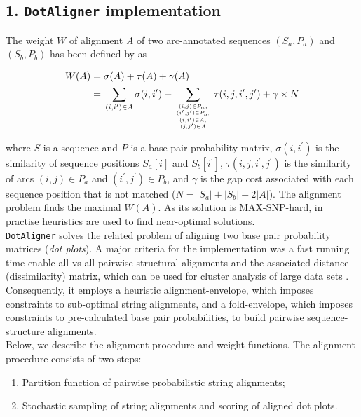 \documentclass{bmcart}
\newcommand\dotaligner{\texttt{DotAligner}}
\begin{document}
\subsection*{ 1. \dotaligner{} implementation }
\noindent The weight $W$ of alignment \emph{A}
of two arc-annotated sequences $(S_a,P_a)$ and $(S_b,P_b)$ has been defined by \cite{Palu2010} as

\begin{equation}\label{eq1}
\begin{aligned}
	W(A) ={} & \sigma(A) + \tau(A) + \gamma(A) \\
	     ={} & \sum_{(i,i^\prime) \in A} \sigma(i,i^\prime) + \sum_{(i,j) \in
	P_a,\atop {(i^\prime,j^\prime) \in P_b,\atop {(i,i^\prime) \in
	A,\atop (j,j^\prime) \in A}}} \tau(i,j,i^\prime,j^\prime) + \gamma
	\times N
\end{aligned}
\end{equation}

\noindent where $S$ is a sequence and $P$ is a base pair probability matrix,
$\sigma(i,i^\prime)$ is the similarity of sequence positions $S_a[i]$ and
$S_b[i^\prime]$, $\tau(i,j,i^\prime,j^\prime)$ is the similarity of arcs $(i,j)
\in P_a$ and $(i^\prime,j^\prime) \in P_b$,
and $\gamma$ is the gap cost associated with each sequence position that is not
matched ($N = |S_a|+|S_b|-2|A|$). The alignment problem finds the maximal
$W(A)$. As its solution is MAX-SNP-hard, in practise heuristics are used to find
near-optimal solutions.\\

\dotaligner{} solves the related problem of aligning two base pair
probability matrices (\emph{dot plots}). A major criteria for the implementation was a fast
running time enable all-vs-all pairwise structural alignments and the 
associated distance (dissimilarity) matrix, which can be used for 
cluster analysis of large data sets \cite{Will17432929}. Consequently, 
it employs a heuristic alignment-envelope, 
which imposes constraints to sub-optimal string alignments, 
and a fold-envelope, which imposes constraints to pre-calculated base pair probabilities, 
to build pairwise sequence-structure alignments. \\

Below, we describe the alignment procedure and weight functions.
The alignment procedure consists of two steps:
\begin{enumerate}
  \item Partition function of pairwise probabilistic string alignments; 
  \item Stochastic sampling of string alignments and scoring of aligned dot plots.
\end{enumerate}
\end{document}
